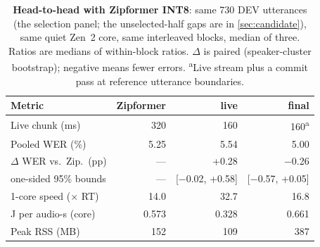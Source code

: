 \begin{table}[t]
\centering
\caption{\textbf{Head-to-head with Zipformer INT8}: same 730 DEV utterances (the selection panel; the unselected-half gaps are in \cref{sec:candidate}), same quiet Zen~2 core, same interleaved blocks, median of three. Ratios are medians of within-block ratios. $\Delta$ is paired (speaker-cluster bootstrap); negative means fewer errors. \textsuperscript{a}Live stream plus a commit pass at reference utterance boundaries.}
\label{tab:versus}
\footnotesize
\setlength{\tabcolsep}{1.5pt}
\begin{tabular}{@{}lrrr@{}}
\toprule
Metric & Zipformer & \ultra{} live & \ultra{} final \\
\midrule
Live chunk (ms) & 320 & 160 & 160\textsuperscript{a} \\
Pooled WER (\%) & 5.25 & 5.54 & 5.00 \\
$\Delta$ WER vs.\ Zip.\ (pp) & --- & +0.28 & $-$0.26 \\
\quad one-sided 95\% bounds & --- & [$-$0.02, +0.58] & [$-$0.57, +0.05] \\
1-core speed ($\times$ RT) & 14.0 & 32.7 & 16.8 \\
J per audio-s (core) & 0.573 & 0.328 & 0.661 \\
Peak RSS (MB) & 152 & 109 & 387 \\
\bottomrule
\end{tabular}
\end{table}
